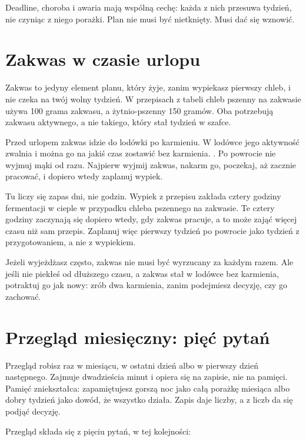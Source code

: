 Deadline, choroba i awaria mają wspólną cechę: każda z nich przesuwa tydzień, nie czyniąc z niego porażki. Plan nie musi być nietknięty. Musi dać się wznowić.

\section{Zakwas w czasie urlopu}

Zakwas to jedyny element planu, który żyje, zanim wypiekasz pierwszy chleb, i nie czeka na twój wolny tydzień. W przepisach z tabeli chleb pszenny na zakwasie używa 100 grama zakwasu, a żytnio-pszenny 150 gramów. Oba potrzebują zakwasu aktywnego, a nie takiego, który stał tydzień w szafce.

Przed urlopem zakwas idzie do lodówki po karmieniu. W lodówce jego aktywność zwalnia i można go na jakiś czas zostawić bez karmienia. . Po powrocie nie wyjmuj mąki od razu. Najpierw wyjmij zakwas, nakarm go, poczekaj, aż zacznie pracować, i dopiero wtedy zaplanuj wypiek.

Tu liczy się zapas dni, nie godzin. Wypiek z przepisu zakłada cztery godziny fermentacji w cieple w przypadku chleba pszennego na zakwasie. Te cztery godziny zaczynają się dopiero wtedy, gdy zakwas pracuje, a to może zająć więcej czasu niż sam przepis. Zaplanuj więc pierwszy tydzień po powrocie jako tydzień z przygotowaniem, a nie z wypiekiem.

Jeżeli wyjeżdżasz często, zakwas nie musi być wyrzucany za każdym razem. Ale jeśli nie piekłeś od dłuższego czasu, a zakwas stał w lodówce bez karmienia, potraktuj go jak nowy: zrób dwa karmienia, zanim podejmiesz decyzję, czy go zachować.

\section{Przegląd miesięczny: pięć pytań}

Przegląd robisz raz w miesiącu, w ostatni dzień albo w pierwszy dzień następnego. Zajmuje dwadzieścia minut i opiera się na zapisie, nie na pamięci. Pamięć zniekształca: zapamiętujesz gorszą noc jako całą porażkę miesiąca albo dobry tydzień jako dowód, że wszystko działa. Zapis daje liczby, a z liczb da się podjąć decyzję.

Przegląd składa się z pięciu pytań, w tej kolejności:

